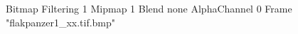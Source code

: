 {Bitmap
	{Filtering 1}
	{Mipmap 1}
	{Blend none}
	{AlphaChannel 0}
	{Frame "flakpanzer1_xx.tif.bmp"}
}
